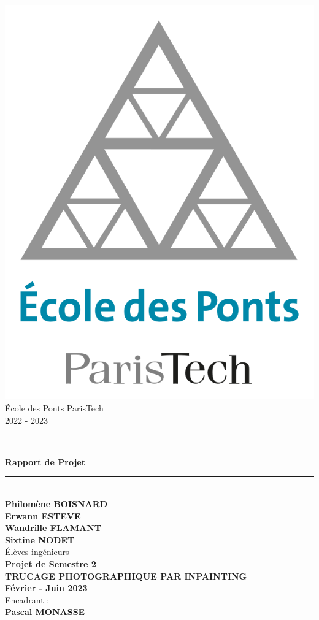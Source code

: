 \documentclass[12pt]{article}
\begin{document}
\begin{titlepage}
\newcommand{\HRule}{\rule{\linewidth}{0.5mm}}
\newcommand{\hRule}{\rule{\linewidth}{0.1mm}}
\center
\includegraphics[scale=0.16]{logos/ponts.png} \\[1cm]

École des Ponts ParisTech\\
2022 - 2023\\[0.5cm]

\HRule \\[0.4cm]
{ \huge \bfseries Rapport de Projet \\[0.15cm] }
\HRule \\[1.5 cm]

\textbf{Philomène BOISNARD} \\[0.2cm]
\textbf{Erwann ESTEVE} \\[0.2cm]
\textbf{Wandrille FLAMANT} \\[0.2cm]
\textbf{Sixtine NODET} \\[0.2cm]
Élèves ingénieurs\\[1.5cm]

\textbf{Projet de Semestre 2} \\ [0.5cm]
\textbf{\Large TRUCAGE PHOTOGRAPHIQUE PAR INPAINTING
} \\[2.5cm]

\textbf{Février - Juin 2023} \\[3cm]

Encadrant : \\ 
\textbf{Pascal MONASSE}\\[0.8cm]

\end{titlepage}
\end{document}
